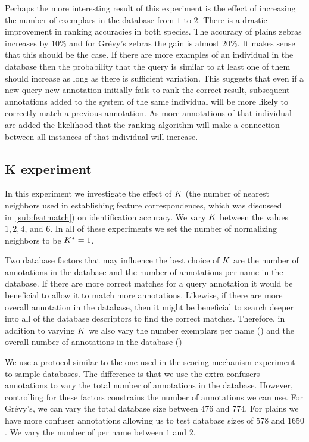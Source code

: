         Perhaps the more interesting result of this experiment is the effect of increasing the number of exemplars
        in the database from $1$ to $2$. There is a drastic improvement in ranking accuracies in both species. The
        accuracy of plains zebras increases by $10\percent$ and for Grévy's zebras the gain is almost $20\percent$.
        It makes sense that this should be the case. If there are more examples of an individual in the database
        then the probability that the query is similar to at least one of them should increase as long as there is
        sufficient variation. This suggests that even if a new query new annotation initially fails to rank the
        correct result, subsequent annotations added to the system of the same individual will be more likely to
        correctly match a previous annotation. As more annotations of that individual are added the likelihood that
        the ranking algorithm will make a connection between all instances of that individual will increase.

        \NScoreExpt{}


    \FloatBarrier{}
    \subsection{K experiment}\label{sub:exptk}  

        In this experiment we investigate the effect of $K$ (the number of nearest neighbors used in establishing
        feature correspondences, which was discussed in~\cref{sub:featmatch}) on identification accuracy. We vary
        $K$ between the values $1, 2, 4$, and $6$. In all of these experiments we set the number of normalizing
        neighbors to be $K^{*}=1$.

        Two database factors that may influence the best choice of $K$ are the number of annotations in the
        database and the number of annotations per name in the database. If there are more correct matches for a
        query annotation it would be beneficial to allow it to match more annotations. Likewise, if there are more
        overall annotation in the database, then it might be beneficial to search deeper into all of the database
        descriptors to find the correct matches. Therefore, in addition to varying $K$ we also vary the number
        exemplars per name () and the overall number of annotations in the database ()

        We use a protocol similar to the one used in the scoring mechanism experiment to sample databases. The
        difference is that we use the extra confusers annotations to vary the total number of annotations in the
        database. However, controlling for these factors constrains the number of annotations we can use. For
        Grévy's, we can vary the total database size between $476$ and $774$. For plains we have more confuser
        annotations allowing us to test database sizes of $578$ and $1650$. We vary the number of \exemplars{} per
        name between $1$ and $2$.

